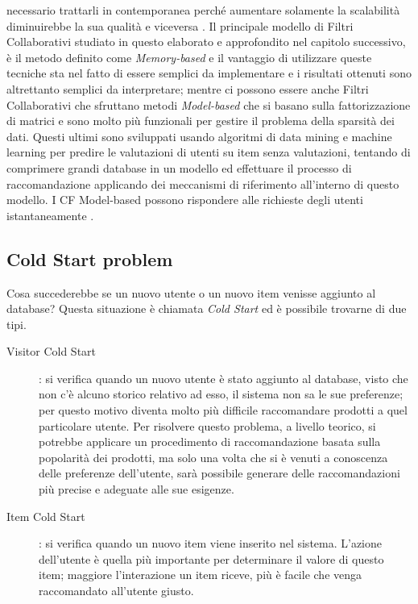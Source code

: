 necessario trattarli in contemporanea perché aumentare solamente la scalabilità diminuirebbe la sua qualità e viceversa 
\cite{item-based-collaborative-filtering}.\hfill\break
Il principale modello di Filtri Collaborativi studiato in questo elaborato e approfondito nel capitolo successivo, è il metodo definito 
come \textit{Memory-based} e il  vantaggio di utilizzare queste tecniche sta nel fatto di essere semplici da implementare e i risultati 
ottenuti sono altrettanto semplici da interpretare; mentre ci possono essere anche Filtri Collaborativi che sfruttano metodi 
\textit{Model-based} che si basano sulla fattorizzazione di matrici e sono molto più funzionali per gestire il problema della 
sparsità dei dati. Questi ultimi sono sviluppati usando algoritmi di data mining e machine learning per predire le valutazioni di utenti 
su item senza valutazioni, tentando di comprimere grandi database in un modello ed effettuare il processo di raccomandazione applicando dei 
meccanismi di riferimento all'interno di questo modello.
I CF Model-based possono rispondere alle richieste degli utenti istantaneamente \cite{model-based-approach-for-collaborative-filtering}.
%
\subsection{Cold Start problem} 
Cosa succederebbe se un nuovo utente o un nuovo item venisse aggiunto al database? Questa situazione è chiamata \textit{Cold Start} ed 
è possibile trovarne di due tipi.
\begin{description}
    \item[Visitor Cold Start]: si verifica quando un nuovo utente è stato aggiunto al database, visto che non c'è alcuno storico relativo ad esso, il sistema non 
    sa le sue preferenze; per questo motivo diventa molto più difficile raccomandare prodotti a quel particolare utente. Per risolvere questo problema, 
    a livello teorico, si potrebbe applicare un procedimento di raccomandazione basata sulla popolarità dei prodotti, ma solo una volta che si è venuti a 
    conoscenza delle preferenze dell'utente, sarà possibile generare delle raccomandazioni più precise e adeguate alle sue esigenze.
    \item[Item Cold Start]: si verifica quando un nuovo item viene inserito nel sistema. L'azione dell'utente è quella più importante per determinare 
    il valore di questo item; maggiore l'interazione un item riceve, più è facile che venga raccomandato all'utente giusto.
\end{description}
